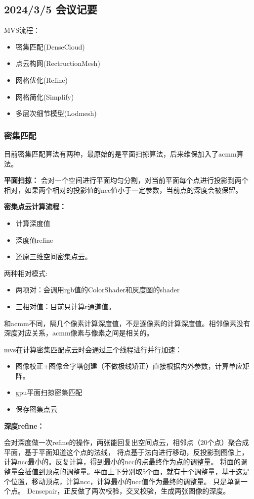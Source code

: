 \subsection{2024/3/5 会议记要}
MVS流程：
\begin{itemize}
	\item 密集匹配(DenseCloud)
	\item 点云构网(RectructionMesh)
	\item 网格优化(Refine)
	\item 网格简化(Simplify)
	\item 多层次细节模型(Lodmesh)
\end{itemize}

\subsubsection{密集匹配}
目前密集匹配算法有两种，最原始的是平面扫掠算法，后来维保加入了acmm算法。

\textbf{平面扫掠：}
会对一个空间进行平面均匀分割，对当前平面每个点进行投影到两个相对，如果两个相对的投影值的ncc值小于一定参数，当前点的深度会被保留。


\textbf{密集点云计算流程：}
\begin{itemize}
	\item 计算深度值
	\item 深度值refine
	\item 还原三维空间密集点云。
\end{itemize}

两种相对模式:
\begin{itemize}
	\item 两项对：会调用rgb值的ColorShader和灰度图的shader
	\item 三相对值：目前只计算r通道值。
\end{itemize}

和acmm不同，隔几个像素计算深度值，不是逐像素的计算深度值。相邻像素没有深度对应关系，acmm像素与像素之间是相关的。

mvs在计算密集匹配点云时会通过三个线程进行并行加速：

\begin{itemize}
	\item 图像校正+图像金字塔创建（不做极线矫正）直接根据内外参数，计算单应矩阵。
	\item gpu平面扫掠密集匹配
	\item 保存密集点云
\end{itemize}

\textbf{深度refine：}

会对深度做一次refine的操作，两张能回复出空间点云，相邻点（20个点）聚合成平面，基于平面知道这个点的法线，
将点基于法向进行移动，反投影到图像上，计算ncc最小的。反复计算，得到最小的ncc的点最终作为点的调整量。
将面的调整量会插值到顶点的调整量。平面上下分别取5个面，就有十个调整量，基于这是个位置，移动顶点，计算ncc，计算最小的ncc值作为最终的调整量。
只是单调一个点。
Densepair，正反做了两次校验，交叉校验，生成两张图像的深度。


